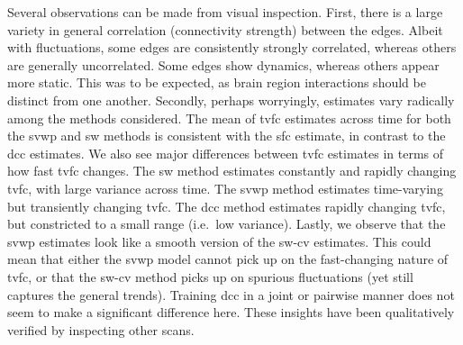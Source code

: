 Several observations can be made from visual inspection.
%
First, there is a large variety in general correlation (connectivity strength) between the edges.
Albeit with fluctuations, some edges are consistently strongly correlated, whereas others are generally uncorrelated.
Some edges show dynamics, whereas others appear more static.
This was to be expected, as brain region interactions should be distinct from one another.
%
Secondly, perhaps worryingly, estimates vary radically among the methods considered.
The mean of \gls{tvfc} estimates across time for both the \gls{svwp} and \gls{sw} methods is consistent with the \gls{sfc} estimate, in contrast to the \gls{dcc} estimates.
We also see major differences between \gls{tvfc} estimates in terms of how fast \gls{tvfc} changes.
The \gls{sw} method estimates constantly and rapidly changing \gls{tvfc}, with large variance across time.
The \gls{svwp} method estimates time-varying but transiently changing \gls{tvfc}.
The \gls{dcc} method estimates rapidly changing \gls{tvfc}, but constricted to a small range (i.e.~low variance).
%
Lastly, we observe that the \gls{svwp} estimates look like a smooth version of the \gls{sw-cv} estimates.
This could mean that either the \gls{svwp} model cannot pick up on the fast-changing nature of \gls{tvfc}, or that the \gls{sw-cv} method picks up on spurious fluctuations (yet still captures the general trends).
Training \gls{dcc} in a joint or pairwise manner does not seem to make a significant difference here.
%
These insights have been qualitatively verified by inspecting other scans.


